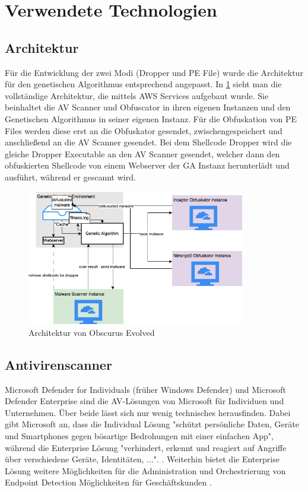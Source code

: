 \section{Verwendete Technologien}
\label{Sec:Technologie}
\subsection{Architektur}
Für die Entwicklung der zwei Modi (Dropper und PE File) wurde die Architektur für den genetischen Algorithmus entsprechend angepasst. In \ref{fig:architecture} sieht man die vollständige Architektur, die mittels AWS Services aufgebaut wurde. Sie beinhaltet die AV Scanner und Obfuscator in ihren eigenen Instanzen und den Genetischen Algorithmus in seiner eigenen Instanz. Für die Obfuskation von PE Files werden diese erst an die Obfuskator gesendet, zwischengespeichert und anschließend an die AV Scanner gesendet. Bei dem Shellcode Dropper wird die gleiche Dropper Executable an den AV Scanner gesendet, welcher dann den obfuskierten Shellcode von einem Webserver der GA Instanz herunterlädt und ausführt, während er gescannt wird.
\begin{figure}[h]
    \centering
    \includegraphics[width=0.85\textwidth]{gfx/Abbildungen/Architektur.drawio.png}
    \caption{Architektur von Obscurus Evolved}
    \label{fig:architecture}
\end{figure}



    
\subsection{Antivirenscanner}
Microsoft Defender for Individuals (früher Windows Defender) und Microsoft Defender Enterprise sind die AV-Lösungen von Microsoft für Individuen und Unternehmen. Über beide lässt sich nur wenig technisches herausfinden. Dabei gibt Microsoft an, dass die Individual Lösung "schützt persönliche Daten, Geräte und Smartphones gegen bösartige Bedrohungen mit einer einfachen App", während die Enterprise Lösung "verhindert, erkennt und reagiert auf Angriffe über verschiedene Geräte, Identitäten, ...". . Weiterhin bietet die Enterprise Lösung weitere Möglichkeiten für die Administration und Orchestrierung von Endpoint Detection Möglichkeiten für Geschäftskunden \cite{microsoft_microsofta,microsoft_microsoftb}.

